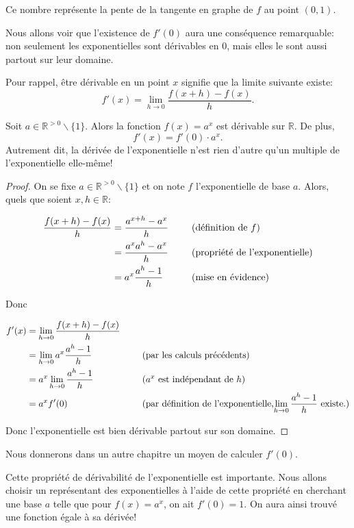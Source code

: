 \documentclass[a4paper,12pt,singlepage]{report}
\newcommand{\IR}{\mathbb{R}}
\begin{document}
Ce nombre représente la pente de la tangente en graphe de \(f\) au point \((0,1)\).

Nous allons voir que l'existence de \(f'(0)\) aura une conséquence remarquable:
non seulement les exponentielles sont dérivables en 0, mais elles le sont aussi
partout sur leur domaine.

Pour rappel, être dérivable en un point \(x\) signifie que la limite suivante
existe:
\[
f'(x)=\lim_{h\to 0} \frac{f(x+h)-f(x)}{h}.
\]

\begin{propriete}
Soit \(a\in \IR^{>0}\backslash\{1\}\). Alors la fonction \(f(x)=a^x\) est dérivable
sur \(\IR\). De plus,
\[
f'(x)=f'(0)\cdot a^x.
\]
Autrement dit, la dérivée de l'exponentielle n'est rien d'autre qu'un multiple
de l'exponentielle elle-même!
\end{propriete}

\begin{proof}
On se fixe \(a\in \IR^{>0}\backslash\{1\}\) et on note \(f\) l'exponentielle de base
\(a\). Alors, quels que soient \(x,h\in\IR\):

\begin{alignat*}{3}
\frac{f(x+h)-f(x)}{h}&= \frac{a^{x+h}-a^x}{h}&\hspace{0.5cm}&\text{(définition de $f$)}\\
&=\frac{a^xa^h-a^x}{h}&&\text{(propriété de l'exponentielle)}\\
&=a^x\frac{a^h-1}{h}&&\text{(mise en évidence)}
\end{alignat*}

Donc

\begin{alignat*}{3}
f'(x)&=\lim_{h\to 0} \frac{f(x+h)-f(x)}{h}&\hspace{0.5cm}&\\
&=\lim_{h\to 0} a^x\frac{a^h-1}{h}&&\text{(par les calculs précédents)}\\
&=a^x\lim_{h\to 0} \frac{a^h-1}{h} &&\text{($a^x$ est indépendant de $h$)}\\
&=a^x f'(0)&&\text{(par définition de l'exponentielle,$\lim_{h\to 0} \frac{a^h-1}{h}$ existe.)}
\end{alignat*}

Donc l'exponentielle est bien dérivable partout sur son domaine.
\end{proof}

Nous donnerons dans un autre chapitre un moyen de calculer \(f'(0)\).

Cette propriété de dérivabilité de l'exponentielle est importante. Nous allons
choisir un représentant des exponentielles à l'aide de cette propriété en
cherchant une base \(a\) telle que pour \(f(x)=a^x\), on ait \(f'(0)=1\). On aura
ainsi trouvé une fonction égale à sa dérivée!
\end{document}
